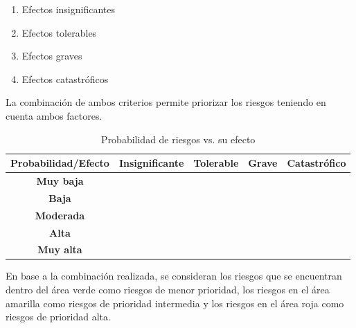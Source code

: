 \begin{enumerate}
    \item Efectos insignificantes
    \item Efectos tolerables
    \item Efectos graves
    \item Efectos catastróficos
\end{enumerate}

La combinación de ambos criterios permite priorizar los riesgos teniendo en cuenta ambos factores.
\begin{table}[h]
    \begin{tabular}{|c|c|c|c|c|}
    \hline
    \textbf{Probabilidad/Efecto}& \textbf{Insignificante} & \textbf{Tolerable} & \textbf{Grave} & \textbf{Catastrófico}\\
    \hline
    \textbf{Muy baja} &\cellcolor{YellowGreen} &\cellcolor{YellowGreen} &\cellcolor{YellowGreen} & \cellcolor{yellow}\\
    \hline
    \textbf{Baja} & \cellcolor{YellowGreen} & \cellcolor{YellowGreen} & \cellcolor{yellow} & \cellcolor{yellow}\\
    \hline
    \textbf{Moderada} & \cellcolor{YellowGreen} & \cellcolor{yellow} &\cellcolor{yellow} & \cellcolor{red}\\
    \hline
    \textbf{Alta} & \cellcolor{yellow} & \cellcolor{yellow} & \cellcolor{red} & \cellcolor{red} \\
    \hline
    \textbf{Muy alta} &\cellcolor{yellow} & \cellcolor{red}& \cellcolor{red}&\cellcolor{red}\\
    \hline
    \end{tabular}
    \caption{Probabilidad de riesgos vs. su efecto}
\end{table}
En base a la combinación realizada, se consideran los riesgos que se encuentran dentro del área verde como riesgos de menor prioridad, los riesgos en el área amarilla como riesgos de prioridad intermedia y los riesgos en el área roja como riesgos de prioridad alta.
